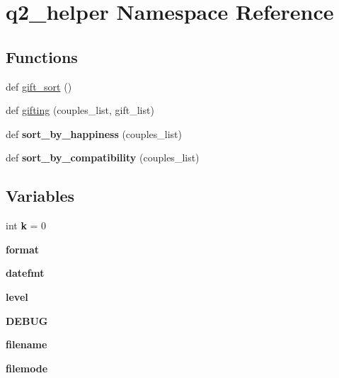 \hypertarget{namespaceq2__helper}{}\section{q2\+\_\+helper Namespace Reference}
\label{namespaceq2__helper}
\subsection*{Functions}
\begin{DoxyCompactItemize}
\item 
def \hyperlink{namespaceq2__helper_a8b3d3b435300fd1f72d5dcf384d378ae}{gift\+\_\+sort} ()
\item 
def \hyperlink{namespaceq2__helper_ac0013034c33667bd83f64de880d2d177}{gifting} (couples\+\_\+list, gift\+\_\+list)
\item 
\mbox{\label{namespaceq2__helper_aa1be2d7c40a76485c6c99c01d70f7f94}} 
def {\bfseries sort\+\_\+by\+\_\+happiness} (couples\+\_\+list)
\item 
\mbox{\label{namespaceq2__helper_ac8e0cbab1bea854b3f1457f81b26324f}} 
def {\bfseries sort\+\_\+by\+\_\+compatibility} (couples\+\_\+list)
\end{DoxyCompactItemize}
\subsection*{Variables}
\begin{DoxyCompactItemize}
\item 
\mbox{\label{namespaceq2__helper_a707dcdaaab43b6d4969a0cb3cabe7f8d}} 
int {\bfseries k} = 0
\item 
\mbox{\label{namespaceq2__helper_a17733fc799bfce7e94f29dc9f8d0538e}} 
{\bfseries format}
\item 
\mbox{\label{namespaceq2__helper_ae8d3b2c21f94189201a72219b15efff5}} 
{\bfseries datefmt}
\item 
\mbox{\label{namespaceq2__helper_a6bf9379ce8dbb3cbe4e6cce5844d5be2}} 
{\bfseries level}
\item 
\mbox{\label{namespaceq2__helper_a3ff914f74a8a008805e4f07bda9723d6}} 
{\bfseries D\+E\+B\+UG}
\item 
\mbox{\label{namespaceq2__helper_a576aee952f4e47794fcdb43c4aebeb49}} 
{\bfseries filename}
\item 
\mbox{\label{namespaceq2__helper_a7d612174511c4ec56695533c317cfdc6}} 
{\bfseries filemode}
\end{DoxyCompactItemize}


